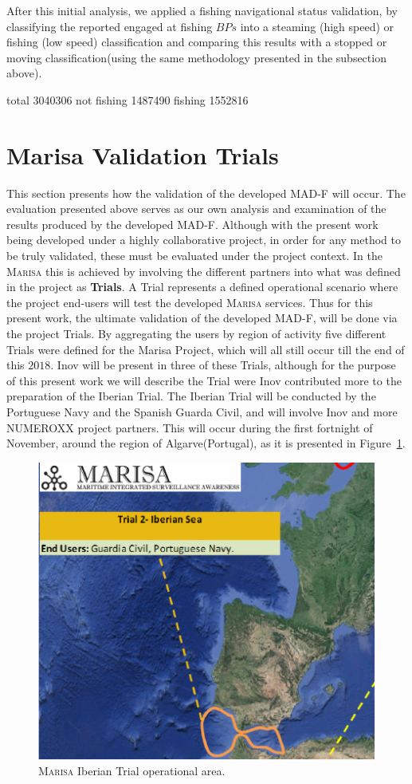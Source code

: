 After this initial analysis, we applied a fishing navigational status validation, by classifying the reported engaged at fishing $BPs$ into a steaming (high speed) or fishing (low speed) classification and comparing this results with a stopped or moving classification(using the same methodology presented in the subsection above).

total 3040306
not fishing 1487490
fishing 1552816


\section{Marisa Validation Trials}
This section presents how the validation of the developed MAD-F will occur. The evaluation presented above serves as our own analysis and examination of the results produced by the developed MAD-F. Although with the present work being developed under a highly collaborative project, in order for any method to be truly validated, these must be evaluated under the project context. In the \textsc{Marisa} this is achieved by involving the different partners into what was defined in the project as \textbf{Trials}. A Trial represents a defined operational scenario where the project end-users will test the developed \textsc{Marisa} services. Thus for this present work, the ultimate validation of the developed MAD-F, will be done via the project Trials. By aggregating the users by region of activity five different Trials were defined for the Marisa Project, which will all still occur till the end of this $2018$. Inov will be present in three of these Trials, although for the purpose of this present work we will describe the Trial were Inov contributed more to the preparation of the Iberian Trial. The Iberian Trial will be conducted by the Portuguese Navy and the Spanish Guarda Civil, and will involve Inov and more NUMEROXX project partners. This will occur during the first fortnight of November, around the region of Algarve(Portugal), as it is presented in Figure~\ref{fig: 5 TrialArea}.  

\begin{figure}[H]
	\centering
	\includegraphics[scale=1.2]{figures/Ch5/IberainTrial.pdf}
    \caption{\textsc{Marisa} Iberian Trial operational area.}
    \label{fig: 5 TrialArea}
\end{figure}


